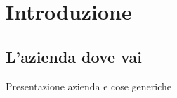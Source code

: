 \mainmatter

\chapter{Introduzione}

\section{L'azienda dove vai}
Presentazione azienda e cose generiche